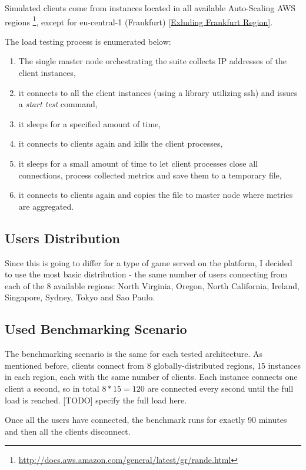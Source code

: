 \documentclass{uvamscse}
\begin{document}
Simulated clients come from instances located in all available Auto-Scaling AWS regions \footnote{\url{http://docs.aws.amazon.com/general/latest/gr/rande.html}}, except for eu-central-1 (Frankfurt) \ref{Exluding Frankfurt Region}.

The load testing process is enumerated below:
\begin{enumerate}
  \item The single master node orchestrating the suite collects IP addresses of the client instances,
  \item it connects to all the client instances (using a library utilizing ssh) and issues a \textit{start test} command,
  \item it sleeps for a specified amount of time,
  \item it connects to clients again and kills the client processes,
  \item it sleeps for a small amount of time to let client processes close all connections, process collected metrics and save them to a temporary file,
  \item it connects to clients again and copies the file to master node where metrics are aggregated.
\end{enumerate}

\subsection{Users Distribution}

Since this is going to differ for a type of game served on the platform, I decided to use the most basic distribution - the same number of users connecting from each of the 8 available regions: North Virginia, Oregon, North California, Ireland, Singapore, Sydney, Tokyo and Sao Paulo.

\subsection{Used Benchmarking Scenario}\label{Used Benchmarking Scenario}

The benchmarking scenario is the same for each tested architecture. As mentioned before, clients connect from 8 globally-distributed regions, 15 instances in each region, each with the same number of clients. Each instance connects one client a second, so in total $8*15=120$ are connected every second until the full load is reached. [TODO] specify the full load here.

Once all the users have connected, the benchmark runs for exactly 90 minutes and then all the clients disconnect.
\end{document}
